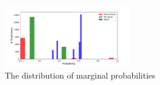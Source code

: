 \begin{figure}[th]
   \includegraphics[width=0.5\textwidth]{resources/genmodel_pred_probs}
   \caption{The distribution of marginal probabilities}
   \label{fig:genmodel_pred_probs}
   \centering
\end{figure}


